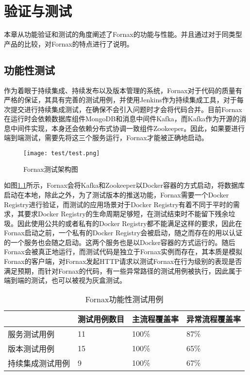 
\chapter{验证与测试}
\label{chap:test}

本章从功能验证和测试的角度阐述了Fornax的功能与性能。并且通过对于同类型产品的比较，对Fornax的特点进行了说明。

\section{功能性测试}

作为着眼于持续集成、持续发布以及版本管理的系统，Fornax对于代码的质量有严格的保证，其具有完善的测试用例，并使用Jenkins作为持续集成工具，对于每次提交进行持续集成测试，在确保不会引入问题时才会将代码合并。目前Fornax在运行时会依赖数据库组件MongoDB和消息中间件Kafka，而Kafka作为开源的消息中间件实现，本身还会依赖分布式协调一致组件Zookeeper。因此，如果要进行端到端测试，需要先将这三个服务运行，Fornax才能被正确地启动。

\begin{figure}[!htp]
  \centering
  \texttt{[image: test/test.png]}
  \caption{Fornax测试架构图}
  \label{fig:test}
\end{figure}

如图\ref{fig:test}所示，Fornax会将Kafka和Zookeeper以Docker容器的方式启动，将数据库启动在本地，除此之外，为了测试版本的推送功能，Fornax需要一个Docker Registry进行验证，而测试的应用场景对于Docker Registry有着不同于平时的需求，其要求Docker Registry的生命周期足够短，在测试结束时不能留下残余垃圾。因此使用公共的或者私有的Docker Registry都不能满足这样的要求，因此在Fornax启动之前，一个私有的Docker Registry会被启动，随之而存在的用以认证的一个服务也会随之启动。这两个服务也是以Docker容器的方式运行的。随后Fornax会被真正地运行，而测试代码是独立于Fornax实例而存在，其本质是模拟Fornax的客户端，对Fornax发起HTTP请求以测试Fornax在行为级别的表现是否满足预期，而针对Fornax的代码，有一些异常路径的测试用例被执行，因此属于端到端的测试，也可以被视为灰盒测试。

\begin{table}[!hpb]
  \centering
  \caption{Fornax功能性测试用例}
  \label{tab:test}
  \begin{tabular}{llll} \toprule
     & 测试用例数目 & 主流程覆盖率 & 异常流程覆盖率 \\ \midrule
     服务测试用例 & 11 & 100\% & 87\% \\
     版本测试用例 & 15 &100\% & 65\% \\
     持续集成测试用例 & 9 & 100\% & 67\% \\ \bottomrule
  \end{tabular}
\end{table}

